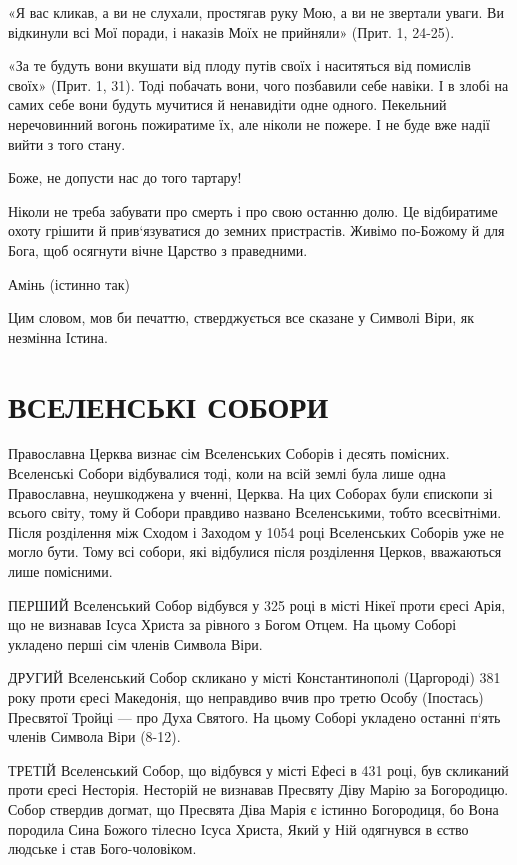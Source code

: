 \documentclass[main.tex]{subfiles}
\begin{document}
«Я вас кликав, а ви не слухали, простягав руку Мою, а ви не звертали уваги. Ви відкинули всі Мої поради, і наказів Моїх не прийняли» (Прит. 1, 24-25).

«За те будуть вони вкушати від плоду путів своїх і наситяться від помислів своїх» (Прит. 1, 31). Тоді побачать вони, чого позбавили себе навіки. І в злобі на самих себе вони будуть мучитися й ненавидіти одне одного. Пекельний неречовинний вогонь пожиратиме їх, але ніколи не пожере. І не буде вже надії вийти з того стану.

Боже, не допусти нас до того тартару!
 
Ніколи не треба забувати про смерть і про свою останню долю. Це відбиратиме охоту грішити й прив`язуватися до земних пристрастів. Живімо по-Божому й для Бога, щоб осягнути вічне Царство з праведними.

Амінь (істинно так)

Цим словом, мов би печаттю, стверджується все сказане у Символі Віри, як незмінна Істина.

\section{ВСЕЛЕНСЬКІ СОБОРИ}

Православна Церква визнає сім Вселенських Соборів і десять помісних. Вселенські Собори відбувалися тоді, коли на всій землі була лише одна Православна, неушкоджена у вченні, Церква. На цих Соборах були єпископи зі всього світу, тому й Собори правдиво названо Вселенськими, тобто всесвітніми. Після розділення між Сходом і Заходом у 1054 році Вселенських Соборів уже не могло бути. Тому всі собори, які відбулися після розділення Церков, вважаються лише помісними.

ПЕРШИЙ Вселенський Собор відбувся у 325 році в місті Нікеї проти єресі Арія, що не визнавав Ісуса Христа за рівного з Богом Отцем. На цьому Соборі укладено перші сім членів Символа Віри.

ДРУГИЙ Вселенський Собор скликано у місті Константинополі (Царгороді) 381 року проти єресі Македонія, що неправдиво вчив про третю Особу (Іпостась) Пресвятої Тройці — про Духа Святого. На цьому Соборі укладено останні п`ять членів Символа Віри (8-12).

ТРЕТІЙ Вселенський Собор, що відбувся у місті Ефесі в 431 році, був скликаний проти єресі Несторія. Несторій не визнавав Пресвяту Діву Марію за Богородицю. Собор ствердив догмат, що Пресвята Діва Марія є істинно Богородиця, бо Вона породила Сина Божого тілесно Ісуса Христа, Який у Ній одягнувся в єство людське і став Бого-чоловіком.
\end{document}
